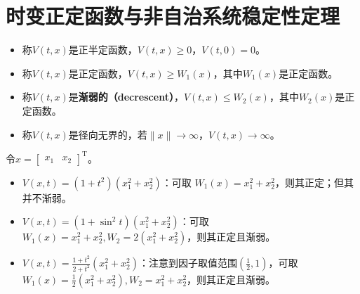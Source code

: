\section{时变正定函数与非自治系统稳定性定理}\label{3Cref}
\begin{definition}
    \begin{itemize}[leftmargin=1em]
      \item 称$V(t,x)$是正半定函数，$V(t,x)\ge 0$，$V(t,0)=0$。
      \item 称$V(t,x)$是正定函数，$V(t,x)\ge W_1(x)$，其中$W_1(x)$是正定函数。
      \item 称$V(t,x)$是{\bf 渐弱的（decrescent）}，$V(t,x)\le W_2(x)$，其中$W_2(x)$是正定函数。
      \item 称$V(t,x)$是径向无界的，若$\|x\|\to\infty$，$V(t,x)\to \infty$。
    \end{itemize}
\end{definition}
\begin{example}
    令$x = [\begin{array}{cc}
    x_1& x_2
  \end{array}]^\mathrm{T}$。
  \begin{itemize}[leftmargin=1em]
    \item $V (x, t) = (1 + t^2) (x^2_1 + x_2^2)$：可取 $W_1 (x) = x^2_1 +
    x^2_2$，则其正定；但其并不渐弱。
    
    \item $V (x, t) = (1 + \sin^2 t) (x^2_1 + x_2^2)$：可取$W_1 (x) = x^2_1 +
    x^2_2, W_2 = 2 (x^2_1 + x^2_2)$，则其正定且渐弱。
    
    \item $V (x, t) = \frac{1 + t^2}{2 + t^2} (x^2_1 + x_2^2)$：注意到因子取值范围$(\frac12,1)$，可取 $W_1 (x)
    = \frac{1}{2} (x^2_1 + x^2_2), W_2 = x^2_1 + x^2_2$，则其正定且渐弱。
  \end{itemize}
\end{example}

